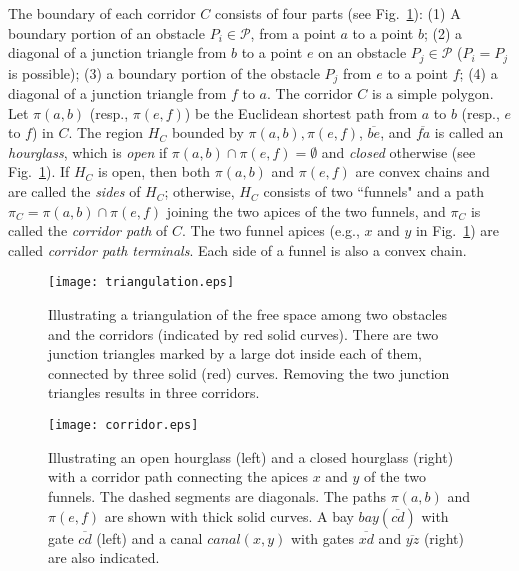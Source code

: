 \documentclass[english,runningheads,11pt]{llncs}
\def\calP{\mathcal{P}}
\def\canal{canal(x,y)}
\begin{document}
The boundary of each corridor $C$ consists of four parts (see
Fig.~\ref{fig:corridor}): (1) A boundary portion of an obstacle
$P_i\in \calP$, from a point $a$ to a point $b$; (2) a diagonal of a
junction triangle from $b$ to a point $e$ on an obstacle
$P_j\in \calP$ ($P_i=P_j$ is possible); (3) a boundary portion of
the obstacle $P_j$ from $e$ to a point $f$; (4) a diagonal of a
junction triangle from $f$ to $a$.
The corridor $C$ is a simple polygon.
Let $\pi(a,b)$ (resp., $\pi(e,f)$) be the Euclidean shortest path from $a$ to $b$
(resp., $e$ to $f$) in $C$. The region $H_C$ bounded by
$\pi(a,b), \pi(e,f)$, $\overline{be}$, and
$\overline{fa}$ is called an {\em hourglass}, which is {\em open} if
$\pi(a,b)\cap \pi(e,f)=\emptyset$ and {\em closed} otherwise (see
Fig.~\ref{fig:corridor}). If $H_C$ is open, then both $\pi(a,b)$ and
$\pi(e,f)$ are convex chains and are called the {\em sides} of
$H_C$; otherwise, $H_C$ consists of two ``funnels" and a path
$\pi_C=\pi(a,b)\cap \pi(e,f)$ joining the two apices of the two
funnels, and $\pi_C$ is called the {\em corridor path} of $C$.
The two funnel apices (e.g., $x$ and $y$ in Fig.~\ref{fig:corridor})
are called {\em corridor path terminals}.
Each side of a funnel is also a convex chain.



\begin{figure}[t]
\begin{minipage}[t]{0.47\linewidth}
\begin{center}
\texttt{[image: triangulation.eps]}
\caption{\footnotesize \cite{ref:ChenCo12arXiv,ref:ChenCo12ICALP} Illustrating a triangulation of the free
space among two obstacles and the corridors (indicated by red solid curves).
There are two junction triangles marked by a large dot inside
each of them, connected by three solid (red) curves. Removing the two
junction triangles results in three corridors.}
\label{fig:triangulation}
\end{center}
\end{minipage}
\hspace*{0.04in}
\begin{minipage}[t]{0.52\linewidth}
\begin{center}
\texttt{[image: corridor.eps]}
\caption{\footnotesize \cite{ref:ChenCo12arXiv,ref:ChenCo12ICALP} Illustrating an open hourglass (left) and a
closed hourglass (right) with a corridor path connecting the apices
$x$ and $y$ of the two funnels. The dashed segments are diagonals.
The paths $\pi(a,b)$ and $\pi(e,f)$ are shown with thick solid
curves. A bay $bay(\overline{cd})$ with gate $\overline{cd}$ (left)
and a canal $\canal$ with gates $\overline{xd}$ and $\overline{yz}$
(right) are also indicated.} \label{fig:corridor}
\end{center}
\end{minipage}
\vspace*{-0.15in}
\end{figure}
\end{document}
